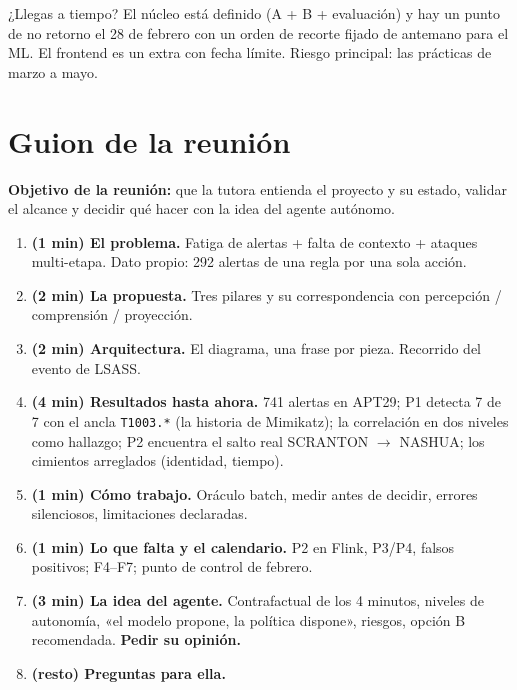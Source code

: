 \documentclass[11pt,a4paper]{article}
\newcommand{\cod}[1]{\texttt{#1}}
\newcommand{\flecha}{$\rightarrow$}
\begin{document}
\begin{pregunta}{¿Llegas a tiempo?}
El núcleo está definido (A + B + evaluación) y hay un punto de no retorno el 28 de febrero con un orden de recorte
fijado de antemano para el ML. El frontend es un extra con fecha límite. Riesgo principal: las prácticas de marzo a mayo.
\end{pregunta}

\newpage
\section{Guion de la reunión}\label{sec:guion}

\textbf{Objetivo de la reunión:} que la tutora entienda el proyecto y su estado, validar el alcance y decidir qué
hacer con la idea del agente autónomo.

\begin{enumerate}
  \item \textbf{(1 min) El problema.} Fatiga de alertas + falta de contexto + ataques multi-etapa. Dato propio: 292
        alertas de una regla por una sola acción.
  \item \textbf{(2 min) La propuesta.} Tres pilares y su correspondencia con percepción / comprensión / proyección.
  \item \textbf{(2 min) Arquitectura.} El diagrama, una frase por pieza. Recorrido del evento de LSASS.
  \item \textbf{(4 min) Resultados hasta ahora.} 741 alertas en APT29; P1 detecta 7 de 7 con el ancla \cod{T1003.*}
        (la historia de Mimikatz); la correlación en dos niveles como hallazgo; P2 encuentra el salto real
        SCRANTON \flecha{} NASHUA; los cimientos arreglados (identidad, tiempo).
  \item \textbf{(1 min) Cómo trabajo.} Oráculo batch, medir antes de decidir, errores silenciosos, limitaciones declaradas.
  \item \textbf{(1 min) Lo que falta y el calendario.} P2 en Flink, P3/P4, falsos positivos; F4–F7; punto de control de febrero.
  \item \textbf{(3 min) La idea del agente.} Contrafactual de los 4 minutos, niveles de autonomía, «el modelo propone,
        la política dispone», riesgos, opción B recomendada. \textbf{Pedir su opinión.}
  \item \textbf{(resto) Preguntas para ella.}
\end{enumerate}
\end{document}
